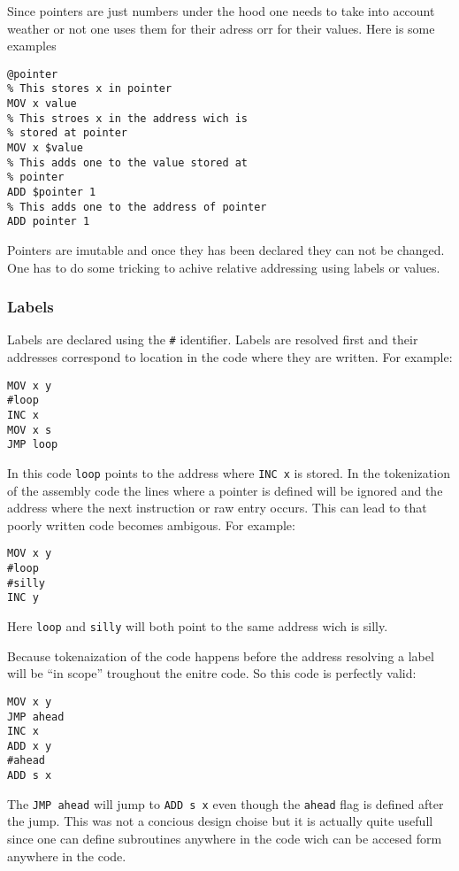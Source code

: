 \documentclass{article}
\newcommand{\V}{\verb}
\begin{document}
Since pointers are just numbers under the hood one needs to take into account
weather or not one uses them for their adress orr for their values. Here is some
examples
\begin{verbatim}
@pointer
% This stores x in pointer
MOV x value
% This stroes x in the address wich is
% stored at pointer
MOV x $value
% This adds one to the value stored at 
% pointer
ADD $pointer 1
% This adds one to the address of pointer
ADD pointer 1
\end{verbatim}

Pointers are imutable and once they has been declared they can not be changed.
One has to do some tricking to achive relative addressing using labels or
values.


\subsubsection{Labels}
Labels are declared using the \V+#+ identifier.
Labels are resolved first and their addresses
correspond to location in the code where they are written. For example:
\begin{verbatim}
MOV x y
#loop
INC x
MOV x s
JMP loop
\end{verbatim}
In this code \V+loop+ points to the address where \V+INC x+ is stored. In the
tokenization of the assembly code the lines where a pointer is defined will be
ignored and the address where the next instruction or raw entry occurs. This can
lead to that poorly written code becomes ambigous. For example:
\begin{verbatim}
MOV x y
#loop
#silly
INC y
\end{verbatim}
Here \V+loop+ and \V+silly+ will both point to the same address wich is silly.

Because tokenaization of the code happens before the address resolving a label
will be ``in scope'' troughout the enitre code. So this code is perfectly valid:

\begin{verbatim}
MOV x y
JMP ahead
INC x
ADD x y
#ahead
ADD s x
\end{verbatim}
The \V+JMP ahead+ will jump to \V+ADD s x+ even though the \V+ahead+ flag is
defined after the jump. This was not a concious design choise but it is actually
quite usefull since one can define subroutines anywhere in the code wich can be
accesed form anywhere in the code.
\end{document}
